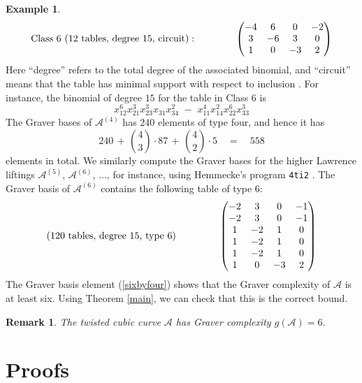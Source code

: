 \documentclass[11pt]{amsart}
\newtheorem{remark}[theorem]{Remark}
\theoremstyle{definition}
\newtheorem{example}[theorem]{Example}
\newcommand{\A}{{\mathcal A}}
\begin{document}
\begin{example}
\begin{eqnarray*}
  \hbox{Class 6 ($12$ tables, degree $15$, circuit)}: \qquad\qquad
  \begin{pmatrix}
  -4 & 6 & 0 & -2 \\  3 & -6 & 3 & 0 \\  1 & 0 & -3 & 2 \\
  \end{pmatrix}
\end{eqnarray*}
Here
``degree'' refers to the total degree of the associated
binomial, and
``circuit'' means that the table has minimal support
with respect to inclusion \cite[\S 4]{Sturmfels-book}.
For instance, the binomial
of degree $15$ for the table in Class 6  is
$$
x_{12}^6 x_{21}^3 x_{23}^3 x_{31} x_{34}^2 \,\, - \,\,
x_{11}^4 x_{14}^2 x_{22}^6 x_{33}^3 $$
The Graver bases of $\A^{(4)}$ has $240$ elements of type four, and
hence it has
  \[
  240 \,+\, \binom{4}{3} \cdot 87  \, +\, \binom{4}{2}
\cdot 5  \quad = \quad 558
  \]
elements in total. We similarly compute the
Graver bases for the higher Lawrence liftings
$\A^{(5)}$, $ \A^{(6)}$,  $ \ldots $,
for instance, using Hemmecke's  program {\tt 4ti2} \cite{Hem}.
The Graver basis of $\A^{(6)}$ contains the following
table of type $6$:
  \begin{equation}
\label{sixbyfour}
  \hbox{($120$ tables, degree $15$, type 6) }\qquad\qquad
  \begin{pmatrix}
  -2 & 3 & 0 & -1 \\  -2 & 3 & 0 & -1 \\
  1 & -2 & 1 & 0 \\   1 & -2 & 1 & 0 \\   1 & -2 & 1 & 0 \\
  1 & 0 & -3 & 2 \\
  \end{pmatrix}
  \end{equation}
The Graver basis element (\ref{sixbyfour}) shows
that the Graver complexity of $\A$ is at least six.
Using Theorem \ref{main}, we can check that this is
the correct bound.

\begin{remark}
\label{rem:twistedGraver}
The twisted cubic curve $\A$ has Graver complexity
$g(\A) = 6$.
\end{remark}
\end{example}

  \section{\bf Proofs}
  \label{sec:proofs}
\end{document}
